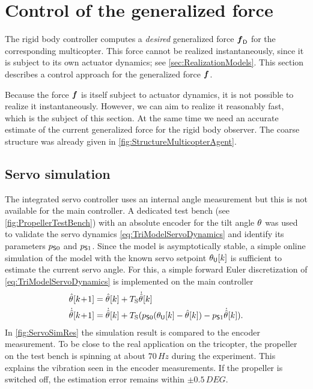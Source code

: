 \section{Control of the generalized force}\label{sec:RealizationForceVectorControl}
The rigid body controller computes a \textit{desired} generalized force $\genForceD$ for the corresponding multicopter.
This force cannot be realized instantaneously, since it is subject to its own actuator dynamics; see \autoref{sec:RealizationModels}.
This section describes a control approach for the generalized force $\genForce$.

Because the force $\genForce$ is itself subject to actuator dynamics, it is not possible to realize it instantaneously.
However, we can aim to realize it reasonably fast, which is the subject of this section.
At the same time we need an accurate estimate of the current generalized force for the rigid body observer.
The coarse structure was already given in \autoref{fig:StructureMulticopterAgent}.

\subsection{Servo simulation}
The integrated servo controller uses an internal angle measurement but this is not available for the main controller.
A dedicated test bench (see \autoref{fig:PropellerTestBench}) with an absolute encoder for the tilt angle $\aServo$ was used to validate the servo dynamics \eqref{eq:TriModelServoDynamics} and identify its parameters $\ServoParam[0]$ and $\ServoParam[1]$.
Since the model is asymptotically stable, a simple online simulation of the model with the known servo setpoint $\aServoU[][k]$ is sufficient to estimate the current servo angle.
For this, a simple forward Euler discretization of \eqref{eq:TriModelServoDynamics} is implemented on the main controller
\begin{subequations}\label{eq:ServoSimulator}
\begin{align}
 \aServoObs[][k\!+\!1] &= \aServoObs[][k] + \Ts \aServoObsd[][k]
\\
 \aServoObsd[][k\!+\!1] &= \aServoObsd[][k] + \Ts( \ServoParam[0] (\aServoU[][k] - \aServoObs[][k]) - \ServoParam[1] \aServoObsd[][k])
 .
\end{align}
\end{subequations}
In \autoref{fig:ServoSimRes} the simulation result is compared to the encoder measurement.
To be close to the real application on the tricopter, the propeller on the test bench is spinning at about $70\,\unit{Hz}$ during the experiment.
This explains the vibration seen in the encoder measurements.
If the propeller is switched off, the estimation error remains within $\pm 0.5\,\unit{DEG}$.

